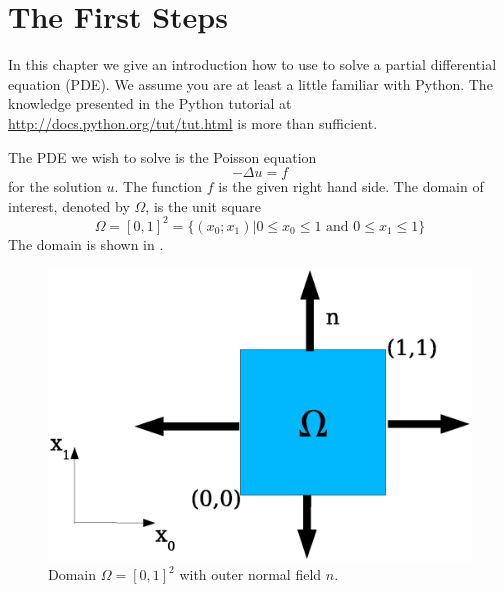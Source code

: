 
%
%
%

\section{The First Steps}\label{FirstSteps} 
In this chapter we give an introduction how to use \escript to solve 
a partial differential equation (PDE).
We assume you are at least a little familiar with Python.
The knowledge presented in the Python tutorial at \url{http://docs.python.org/tut/tut.html} is more than sufficient.

The PDE we wish to solve is the Poisson equation 
\begin{equation}
    -\Delta u=f 
    \label{eq:FirstSteps.1}
\end{equation}
for the solution $u$. The function $f$ is the given right hand side. The domain of interest, denoted by $\Omega$,
is the unit square 
\begin{equation}
\Omega=[0,1]^2=\{ (x_0;x_1) | 0\le x_{0} \le 1 \mbox{ and } 0\le x_{1} \le 1 \}
\label{eq:FirstSteps.1b}
\end{equation}
The domain is shown in .
\begin{figure}[ht]
    \centerline{\includegraphics{FirstStepDomain}}
    \caption{Domain $\Omega=[0,1]^2$ with outer normal field $n$.}
    \label{fig:FirstSteps.1}
\end{figure}

